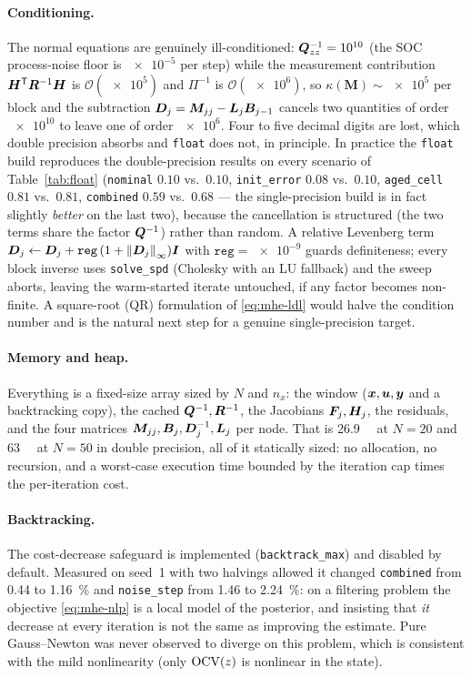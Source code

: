 \paragraph{Conditioning.}  The normal equations are genuinely ill-conditioned:
$\bm{Q}^{-1}_{zz} = \num{e10}$ (the SOC process-noise floor is $\num{e-5}$ per step) while the
measurement contribution $\bm{H}^{\mathsf{T}}\bm{R}^{-1}\bm{H}$ is $\mathcal{O}(\num{e5})$ and $\Pi^{-1}$ is
$\mathcal{O}(\num{e6})$, so $\kappa(\bm{M})\sim\num{e5}$ per block and the subtraction
$\bm{D}_j = \bm{M}_{jj} - \bm{L}_j\bm{B}_{j-1}$ cancels two quantities of order $\num{e10}$ to leave one of
order $\num{e6}$.  Four to five decimal digits are lost, which double precision absorbs and
\texttt{float} does not, in principle.  In practice the \texttt{float} build reproduces the
double-precision results on every scenario of Table~\ref{tab:float} (\texttt{nominal} $0.10$ vs.\
$0.10$, \texttt{init\_error} $0.08$ vs.\ $0.10$, \texttt{aged\_cell} $0.81$ vs.\ $0.81$,
\texttt{combined} $0.59$ vs.\ $0.68$ --- the single-precision build is in fact slightly
\emph{better} on the last two), because the cancellation is structured (the two terms share the
factor $\bm{Q}^{-1}$) rather than random.  A relative Levenberg term
$\bm{D}_j \leftarrow \bm{D}_j + \texttt{reg}\,(1+\left\lVert \bm{D}_j \right\rVert_\infty)\bm{I}$ with $\texttt{reg} = \num{e-9}$
guards definiteness; every block inverse uses \texttt{solve\_spd} (Cholesky with an LU fallback) and
the sweep aborts, leaving the warm-started iterate untouched, if any factor becomes non-finite.
A square-root (QR) formulation of \cref{eq:mhe-ldl} would halve the condition number and is the
natural next step for a genuine single-precision target.

\paragraph{Memory and heap.}  Everything is a fixed-size array sized by $N$ and $n_x$: the window
($\bm{x},\bm{u},\bm{y}$ and a backtracking copy), the cached $\bm{Q}^{-1},\bm{R}^{-1}$, the Jacobians
$\bm{F}_j,\bm{H}_j$, the residuals, and the four matrices $\bm{M}_{jj},\bm{B}_j,\bm{D}_j^{-1},\bm{L}_j$ per node.
That is \SI{26.9}{\kilo\byte} at $N=20$ and \SI{63}{\kilo\byte} at $N=50$ in double
precision, all of it statically sized: no allocation, no recursion, and a worst-case
execution time bounded by the iteration cap times the per-iteration cost.

\paragraph{Backtracking.}  The cost-decrease safeguard is implemented (\texttt{backtrack\_max}) and
disabled by default.  Measured on seed~1 with two halvings allowed it changed \texttt{combined}
from \SI{0.44}{} to \SI{1.16}{\percent} and \texttt{noise\_step} from \SI{1.46}{} to
\SI{2.24}{\percent}: on a filtering problem the
objective \cref{eq:mhe-nlp} is a local model of the posterior, and insisting that \emph{it} decrease
at every iteration is not the same as improving the estimate.  Pure Gauss--Newton was never
observed to diverge on this problem, which is consistent with the mild nonlinearity (only
$\mathrm{OCV}(z)$ is nonlinear in the state).

